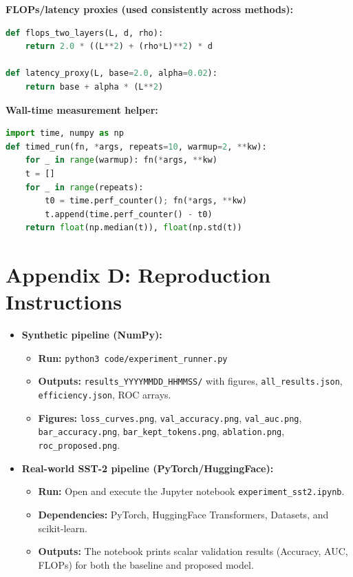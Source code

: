 \documentclass{article}
\begin{document}
\noindent\textbf{FLOPs/latency proxies (used consistently across methods):}
\begin{lstlisting}[language=Python,basicstyle=\ttfamily\small]
def flops_two_layers(L, d, rho):
    return 2.0 * ((L**2) + (rho*L)**2) * d

def latency_proxy(L, base=2.0, alpha=0.02):
    return base + alpha * (L**2)
\end{lstlisting}

\noindent\textbf{Wall-time measurement helper:}
\begin{lstlisting}[language=Python,basicstyle=\ttfamily\small]
import time, numpy as np
def timed_run(fn, *args, repeats=10, warmup=2, **kw):
    for _ in range(warmup): fn(*args, **kw)
    t = []
    for _ in range(repeats):
        t0 = time.perf_counter(); fn(*args, **kw)
        t.append(time.perf_counter() - t0)
    return float(np.median(t)), float(np.std(t))
\end{lstlisting}

\section*{Appendix D: Reproduction Instructions}
\begin{itemize}[leftmargin=1.2em, itemsep=2pt]
  \item \textbf{Synthetic pipeline (NumPy):}
    \begin{itemize}[leftmargin=1.2em, itemsep=2pt]
      \item \textbf{Run:} \texttt{python3 code/experiment\_runner.py}
      \item \textbf{Outputs:} \texttt{results\_YYYYMMDD\_HHMMSS/} with figures, \texttt{all\_results.json}, \texttt{efficiency.json}, ROC arrays.
      \item \textbf{Figures:} \texttt{loss\_curves.png}, \texttt{val\_accuracy.png}, \texttt{val\_auc.png}, 
      \texttt{bar\_accuracy.png}, \texttt{bar\_kept\_tokens.png}, \texttt{ablation.png}, \texttt{roc\_proposed.png}.
    \end{itemize}

  \item \textbf{Real-world SST-2 pipeline (PyTorch/HuggingFace):}
    \begin{itemize}[leftmargin=1.2em, itemsep=2pt]
      \item \textbf{Run:} Open and execute the Jupyter notebook \texttt{experiment\_sst2.ipynb}.
      \item \textbf{Dependencies:} PyTorch, HuggingFace Transformers, Datasets, and scikit-learn.
      \item \textbf{Outputs:} The notebook prints scalar validation results (Accuracy, AUC, FLOPs) for both the baseline and proposed model.
    \end{itemize}
\end{itemize}
\end{document}
